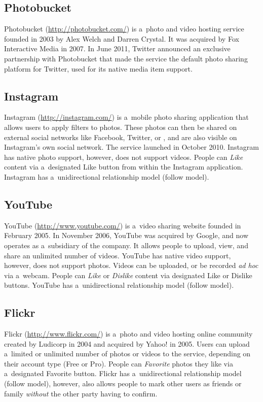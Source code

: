 \subsection{Photobucket}

Photobucket (\url{http://photobucket.com/})
is a~photo and video hosting service
founded in 2003 by Alex Welch and Darren Crystal.
It was acquired by Fox Interactive Media in 2007.
In June 2011, Twitter announced an exclusive partnership
with Photobucket that made the service
the default photo sharing platform for Twitter,
used for its native media item support.

\subsection{Instagram}

Instagram (\url{http://instagram.com/})
is a~mobile photo sharing application
that allows users to apply filters to photos.
These photos can then be shared on external social networks
like Facebook, Twitter, or \googleplus,
and are also visible on Instagram's own social network.
The service launched in October 2010.
Instagram has native photo support, however,
does not support videos.
People can \emph{Like} content via a~designated Like button
from within the Instagram application.
Instagram has a~unidirectional relationship model (follow model).

\subsection{YouTube}

YouTube (\url{http://www.youtube.com/})
is a~video sharing website founded in February 2005.
In November 2006, YouTube was acquired by Google,
and now operates as a~subsidiary of the company.
It allows people to upload, view,
and share an unlimited number of videos.
YouTube has native video support, however, does not support photos.
Videos can be uploaded, or be recorded \emph{ad hoc} via a~webcam.
People can \emph{Like} or \emph{Dislike} content
via designated Like or Dislike buttons.
YouTube has a~unidirectional relationship model (follow model).

\subsection{Flickr}

Flickr (\url{http://www.flickr.com/})
is a~photo and video hosting online community
created by Ludicorp in 2004 and acquired by Yahoo! in 2005.
Users can upload a~limited or unlimited number of photos or videos
to the service, depending on their account type (Free or Pro).
People can \emph{Favorite} photos they like
via a~designated Favorite button.
Flickr has a~unidirectional relationship model (follow model),
however, also allows people to mark other users as friends
or family \emph{without} the other party having to confirm.

